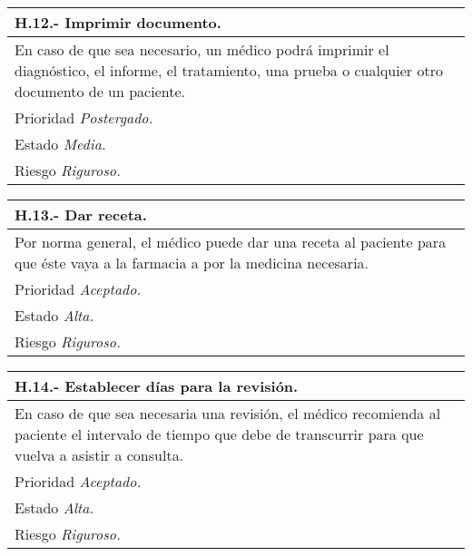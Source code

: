 \documentclass[a4paper,oneside,11pt]{book}
\begin{document}
\begin{center}
\begin{tabulary}{15cm}{|L|}
	\hline
		\bf{H.12.- Imprimir documento.} \\
	\hline
		En caso de que sea necesario, un médico podrá imprimir el diagnóstico, el informe, el tratamiento, una prueba o cualquier otro documento de un paciente. \\
	\hline
		Prioridad \textit{Postergado.} \\
	\hline
		Estado \textit{Media.} \\
	\hline
		Riesgo \textit{Riguroso.} \\
	\hline
\end{tabulary}
\end{center}

\begin{center}
\begin{tabulary}{15cm}{|L|}
	\hline
		\bf{H.13.- Dar receta.} \\
	\hline
		Por norma general, el médico puede dar una receta al paciente para que éste vaya a la farmacia a por la medicina necesaria. \\
	\hline
		Prioridad \textit{Aceptado.} \\
	\hline
		Estado \textit{Alta.} \\
	\hline
		Riesgo \textit{Riguroso.} \\
	\hline
\end{tabulary}
\end{center}

\begin{center}
\begin{tabulary}{15cm}{|L|}
	\hline
		\bf{H.14.- Establecer días para la revisión.} \\
	\hline
		En caso de que sea necesaria una revisión, el médico recomienda al paciente el intervalo de tiempo que debe de transcurrir para que vuelva a asistir a consulta. \\
	\hline
		Prioridad \textit{Aceptado.} \\
	\hline
		Estado \textit{Alta.} \\
	\hline
		Riesgo \textit{Riguroso.} \\
	\hline
\end{tabulary}
\end{center}
\end{document}
